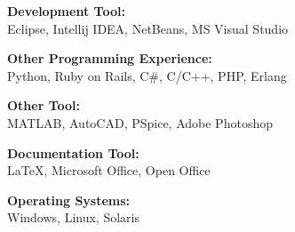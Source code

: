 \documentclass[10pt]{article}
\newcommand{\blankline}{\quad\pagebreak[2]}
\begin{document}
\blankline

{\textbf{Development Tool:}}\\
Eclipse, Intellij IDEA, NetBeans, MS Visual Studio

\blankline

{\textbf{Other Programming Experience:}}\\
Python, Ruby on Rails, C\#, C/C++, PHP, Erlang

\blankline

{\textbf{Other Tool:}}\\
MATLAB, AutoCAD, PSpice, Adobe Photoshop

\blankline

{\textbf{Documentation Tool:}}\\ 
\LaTeX{}, Microsoft Office, Open Office

\blankline

{\textbf{Operating Systems:}}\\
Windows, Linux, Solaris

\newpage
\end{document}
